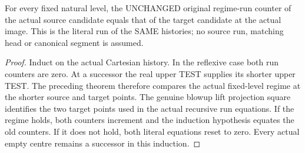 \begin{theorem}
\label{hir:original-untested-modeled-special-smooth-run}
\leanok
For every fixed natural level, the UNCHANGED original regime-run counter
of the actual source candidate equals that of the target candidate at
the actual image. This is the literal run of the SAME histories; no
source run, matching head or canonical segment is assumed.
\end{theorem}
\begin{proof}
Induct on the actual Cartesian history. In the reflexive case both run
counters are zero. At a successor the real upper TEST supplies its
shorter upper TEST. The preceding theorem therefore compares the actual
fixed-level regime at the shorter source and target points. The genuine
blowup lift projection square identifies the two target points used in
the actual recursive run equations. If the regime holds, both counters
increment and the induction hypothesis equates the old counters. If it
does not hold, both literal equations reset to zero. Every actual empty
centre remains a successor in this induction.
\end{proof}

